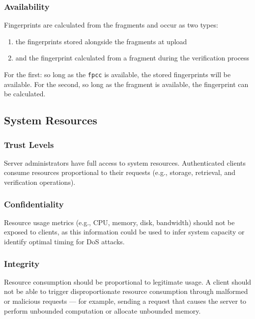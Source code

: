 \documentclass[../veristore_security_model.tex]{subfiles}
\begin{document}
\subsubsection{Availability}
\vspace{-1.5em}

Fingerprints are calculated from the fragments and occur as two types: 
\begin{enumerate}
    \item the fingerprints stored alongside the fragments at upload  
    \item and the fingerprint calculated from a fragment during the verification process
\end{enumerate}

For the first: so long as the \texttt{fpcc} is available, the stored fingerprints will be available. For the second, so long as the fragment is available, the fingerprint can be calculated.

\subsection{System Resources}
\vspace{-1em}
\subsubsection{Trust Levels}
\vspace{-1.5em}

Server administrators have full access to system resources. Authenticated clients consume resources proportional to their requests (e.g., storage, retrieval, and verification operations).

\subsubsection{Confidentiality}
\vspace{-1.5em}

Resource usage metrics (e.g., CPU, memory, disk, bandwidth) should not be exposed to clients, as this information could be used to infer system capacity or identify optimal timing for DoS attacks.

\subsubsection{Integrity}
\vspace{-1.5em}

Resource consumption should be proportional to legitimate usage. A client should not be able to trigger disproportionate resource consumption through malformed or malicious requests — for example, sending a request that causes the server to perform unbounded computation or allocate unbounded memory.
\end{document}
